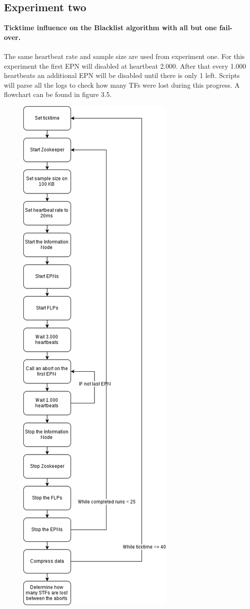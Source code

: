 \newpage
\subsection{Experiment two}
\textbf{Ticktime influence on the Blacklist algorithm with all but one fail-over.}
\\\\
The same heartbeat rate and sample size are used from experiment one. For this experiment the first EPN will disabled at heartbeat 2.000. After that every 1.000 heartbeats an additional EPN will be disabled until there is only 1 left. Scripts will parse all the logs to check how many TFs were lost during this progress. A flowchart can be found in figure 3.5.

\begin{figure}[htb]
    \centering
    \includegraphics[scale=0.3]{./graphics/ex2.png}

\end{figure}
